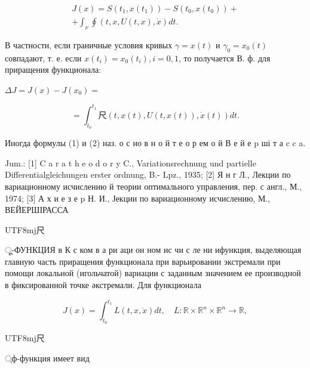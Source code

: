 \documentclass[10pt]{article}
\begin{document}
\[

\begin{gathered}

J(x)=S\left(t_{1}, x\left(t_{1}\right)\right)-S\left(t_{0}, x\left(t_{0}\right)\right)+ \\

+\int_{\nu} \oint(t, x, U(t, x), \dot{x}) d t .

\end{gathered}

\]



В частности, если граничные условия кривых $\gamma=x(t)$ и $\gamma_{0}=x_{0}(t)$ совпадают, т. е. если $x\left(t_{i}\right)=x_{0}\left(t_{i}\right), i=0,1$, то получается В. ф. для приращения функционала:



$\Delta J=J(x)-J\left(x_{0}\right)=$



\[

=\int_{t_{0}}^{t_{1}} 尺(t, x(t), U(t, x(t)), \dot{x}(t)) d t .

\]



Иногда формулы (1) и (2) наз. о с но в н о й т е о р ем о й В е й е p ші т а c c a.



Jum.: [1] C a r a t h e o d o r y C., Variationsrechnung und partielle Differentialgleichungen erster ordnung, B.- $\mathrm{Lpz}$., 1935; [2] Я н г Л., Лекции по вариационному исчислению й теории оптимального управления, пер. с англ., М., 1974; [3] А х и е з е p Н. И., Јекции по вариационному исчислению, М., ВЕЙЕРШІРАССА \begin{CJK}{UTF8}{mj}尺\end{CJK}ू-ФУНКЦИЯ в К с ком в а ри аци он ном ис чи с ле ни ифункция, выделяющая главную часть приращения функционала при варьировании экстремали при помощи локальной (игольчатой) вариации с заданным значением ее производной в фиксированной точке әкстремали. Для функционала



\[

J(x)=\int_{t_{0}}^{t_{1}} L(t, x, \dot{x}) d t, \quad L: \mathbb{R} \times \mathbb{R}^{n} \times \mathbb{R}^{n} \rightarrow \mathbb{R},

\]



\begin{CJK}{UTF8}{mj}尺\end{CJK}्ф-функция имеет вид
\end{document}

